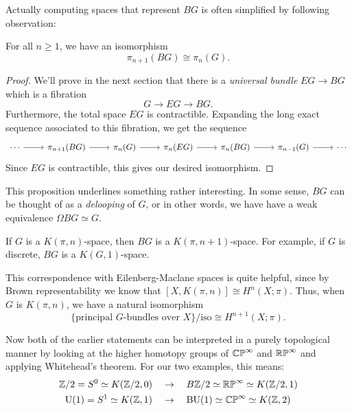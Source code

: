 \documentclass{article}
\begin{document}
Actually computing spaces that represent $BG$ is often simplified by following observation:

\begin{proposition}
  For all $n\geq 1$, we have an isomorphism
  \[
    \pi_{n+1}(BG) \cong \pi_n(G).
  \]
\end{proposition}

\begin{proof}
  We'll prove in the next section that there is a \emph{universal bundle} $EG \to BG$ which is a fibration
  \[
    G \to EG \to BG.
  \]
  Furthermore, the total space $EG$ is contractible. Expanding the long exact sequence associated to this fibration, we get the sequence
\[\begin{tikzcd}
	\cdots & {\pi_{n+1}(BG)} & {\pi_n(G)} & {\pi_n(EG)} & {\pi_n(BG)} & {\pi_{n-1}(G)} & \cdots
	\arrow[from=1-5, to=1-6]
	\arrow[from=1-4, to=1-5]
	\arrow[from=1-3, to=1-4]
	\arrow[from=1-6, to=1-7]
	\arrow[from=1-2, to=1-3]
	\arrow[from=1-1, to=1-2]
\end{tikzcd}\]
Since $EG$ is contractible, this gives our desired isomorphism.
\end{proof}

This proposition underlines something rather interesting. In some sense, $BG$ can be thought of as a \emph{delooping} of $G$, or in other words, we have have a weak equivalence $\Omega BG \simeq G$.

\begin{corollary}
  If $G$ is a $K(\pi,n)$-space, then $BG$ is a $K(\pi,n+1)$-space. For example, if $G$ is discrete, $BG$ is a $K(G,1)$-space.
\end{corollary}

This correspondence with Eilenberg-Maclane spaces is quite helpful, since by Brown representability we know that $[X, K(\pi,n)] \cong H^n(X; \pi)$. Thus, when $G$ is $K(\pi,n)$, we have a natural isomorphism
\[
  \{\textrm{principal $G$-bundles over }X\}/\textrm{iso} \cong H^{n+1}(X; \pi).
\]

Now both of the earlier statements can be interpreted in a purely topological manner by looking at the higher homotopy groups of $\mathbb{CP}^\infty$ and $\mathbb{RP}^\infty$ and applying Whitehead's theorem. For our two examples, this means:
\[
  \begin{aligned}
    \mathbb{Z}/2=S^0 \simeq K(\mathbb{Z}/2, 0) \quad &\rightarrow\quad B\mathbb{Z}/2\simeq \mathbb{RP}^\infty \simeq K(\mathbb{Z}/2, 1)\\
    \mathrm{U}(1)=S^1 \simeq K(\mathbb{Z}, 1) \quad &\rightarrow\quad \mathrm{BU}(1)\simeq \mathbb{CP}^\infty \simeq K(\mathbb{Z}, 2)
  \end{aligned}
\]
\end{document}
